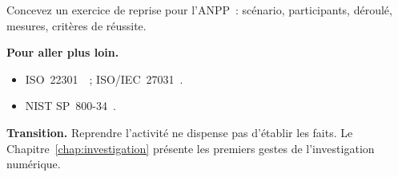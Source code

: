 \begin{boxexo}[title={\ding{45}\quad Exercice~23.10. L'exercice \niveauexpert}]
Concevez un exercice de reprise pour l'ANPP~: scénario, participants,
déroulé, mesures, critères de réussite.
\end{boxexo}

\bigskip

\begin{boxinfo}
\textbf{Pour aller plus loin.}
\begin{itemize}
    \item ISO~22301~\cite{iso22301_2019}~; ISO/IEC~27031~\cite{iso27031_2011}.
    \item NIST SP~800-34~\cite{nist80034}.
\end{itemize}
\end{boxinfo}

\begin{boxinfo}
\textbf{Transition.} Reprendre l'activité ne dispense pas d'établir les
faits. Le Chapitre~\ref{chap:investigation} présente les premiers gestes
de l'investigation numérique.
\end{boxinfo}
